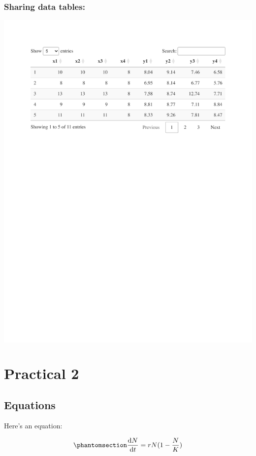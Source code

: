 \documentclass[
  letterpaper,
  DIV=11,
  numbers=noendperiod]{scrreprt}
\theoremstyle{definition}
\theoremstyle{remark}
\begin{document}
\subsection{Sharing data tables:}\label{sharing-data-tables-9}

\includegraphics{differentiation_practical_1_files/figure-pdf/tab-anscombe-1.pdf}

\chapter{Practical 2}\label{practical-2-2}

\section{Equations}\label{equations-10}

Here's an equation:

\begin{equation}\phantomsection\label{eq-log}{ 
\frac{\mathrm{d}N}{\mathrm{d}t} = rN(1 - \frac{N}{K}) 
}\end{equation}
\end{document}
